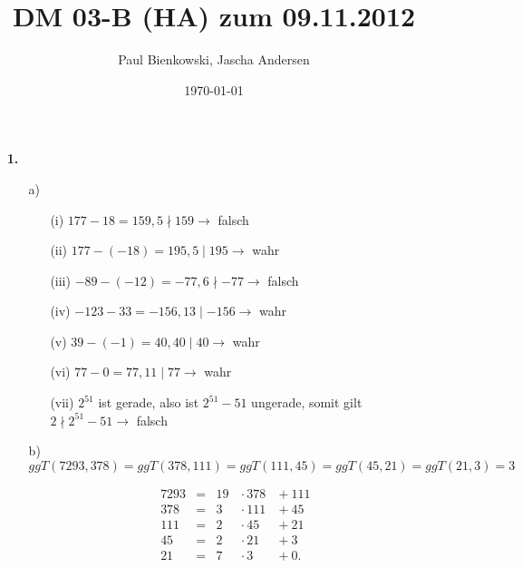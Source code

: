 \documentclass[a4paper,10pt]{scrartcl}
\author{Paul Bienkowski, Jascha Andersen}
\title{DM 03-B (HA) zum 09.11.2012}
\date{\today}
\begin{document}
\setcounter{secnumdepth}{0}
\maketitle

\begin{enumerate}
    \item[\textbf{1.}]
        \begin{enumerate}
            \item[a)]
                \begin{enumerate}
                    \item[(i)]      $177 - 18 = 159, 5 \nmid 159 \rightarrow$ falsch
                    \item[(ii)]     $177 - (-18) = 195, 5 \mid 195 \rightarrow$ wahr
                    \item[(iii)]    $-89 - (-12) = -77, 6 \nmid -77 \rightarrow$ falsch
                    \item[(iv)]     $-123 - 33= -156, 13 \mid -156 \rightarrow$ wahr
                    \item[(v)]      $39 - (-1) = 40, 40 \mid 40 \rightarrow$ wahr
                    \item[(vi)]     $77 - 0 = 77, 11 \mid 77 \rightarrow$  wahr
                    \item[(vii)]    $2^{51}$ ist gerade, also ist $2^{51} - 51$ ungerade, somit gilt $2 \nmid 2^{51} -51 \rightarrow$ falsch
                \end{enumerate}

            \item[b)]
                $ggT(7293, 378) = ggT(378, 111) = ggT(111, 45) = ggT(45, 21) = ggT(21, 3) = 3$

                $$\begin{array}{rcrll}
                    7293 &=& 19 &{}\cdot 378 &{}+ 111\\
                    378  &=&  3 &{}\cdot 111 &{}+ 45\\
                    111  &=&  2 &{}\cdot  45 &{}+ 21\\
                    45   &=&  2 &{}\cdot  21 &{}+ 3\\
                    21   &=&  7 &{}\cdot   3 &{}+ 0.
                \end{array}$$


\end{enumerate}
\end{enumerate}
\end{document}
